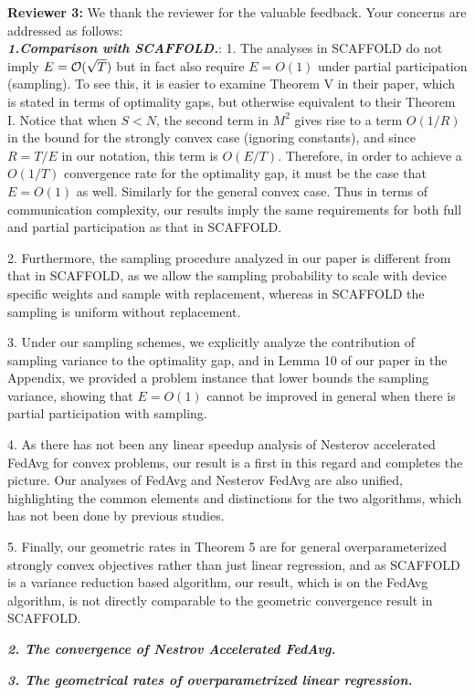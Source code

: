 {\color{blue}\textbf{Reviewer 3:}} We thank the reviewer for the valuable feedback. Your concerns are addressed as follows: \\
\textbf{\textit{1.Comparison with SCAFFOLD.}}: 
1. The analyses in SCAFFOLD do not imply $E={\mathcal{O}}(\sqrt{T})$ but in fact also require $E=O(1)$ under partial participation (sampling). To see this, it is easier to examine Theorem V in their paper, which is stated in terms of optimality gaps, but otherwise equivalent to their Theorem I. Notice that when $S<N$, the second term in $M^2$ gives rise to a term $O(1/R)$ in the bound for the strongly convex case (ignoring constants), and since $R=T/E$ in our notation, this term is $O(E/T)$. Therefore, in order to achieve a $O(1/T)$ convergence rate for the optimality gap, it must be the case that $E=O(1)$ as well. Similarly for the general convex case. Thus in terms of communication complexity, our results imply the same requirements for both full and partial participation as that in SCAFFOLD. 

2. Furthermore, the sampling procedure analyzed in our paper is different from that in SCAFFOLD, as we allow the sampling probability to scale with device specific weights and sample with replacement, whereas in SCAFFOLD the sampling is uniform without replacement. 

3. Under our sampling schemes, we explicitly analyze the contribution of sampling variance to the optimality gap, and in Lemma 10 of our paper in the Appendix, we provided a problem instance that lower bounds the sampling variance, showing that $E=O(1)$ cannot be improved in general when there is partial participation with sampling.

4. As there has not been any linear speedup analysis of Nesterov accelerated FedAvg for convex problems, our result is a first in this regard and completes the picture. Our analyses of FedAvg and Nesterov FedAvg are also unified, highlighting the common elements and distinctions for the two algorithms, which has not been done by previous studies. 

5. Finally, our geometric rates in Theorem 5 are for general overparameterized strongly convex objectives rather than just linear regression, and as SCAFFOLD is a variance reduction based algorithm, our result, which is on the FedAvg algorithm, is not directly comparable to the geometric convergence result in SCAFFOLD.





\textbf{\textit{2. The convergence of Nestrov Accelerated FedAvg.}}



\textbf{\textit{3. The geometrical rates of overparametrized linear regression.}}
